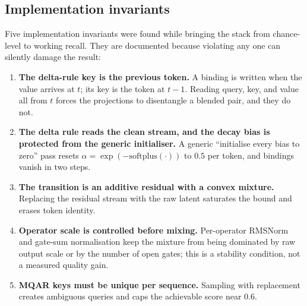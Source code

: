 \subsection{Implementation invariants}

Five implementation invariants were found while bringing the stack from chance-level to working
recall. They are documented because violating any one can silently damage the result:
\begin{enumerate}[leftmargin=1.2em]
\item \textbf{The delta-rule key is the previous token.} A binding is written when the value
      arrives at $t$; its key is the token at $t-1$. Reading query, key, and value all from
      $t$ forces the projections to disentangle a blended pair, and they do not.
\item \textbf{The delta rule reads the clean stream, and the decay bias is protected from the
      generic initialiser.} A generic ``initialise every bias to zero'' pass resets
      $\alpha=\exp(-\mathrm{softplus}(\cdot))$ to $0.5$ per token, and bindings vanish in two
      steps.
\item \textbf{The transition is an additive residual with a convex mixture.} Replacing the
      residual stream with the raw latent saturates the bound and erases token identity.
\item \textbf{Operator scale is controlled before mixing.} Per-operator RMSNorm and
      gate-sum normalisation keep the mixture from being dominated by raw output scale or by
      the number of open gates; this is a stability condition, not a measured quality gain.
\item \textbf{MQAR keys must be unique per sequence.} Sampling with replacement creates
      ambiguous queries and caps the achievable score near $0.6$.
\end{enumerate}
